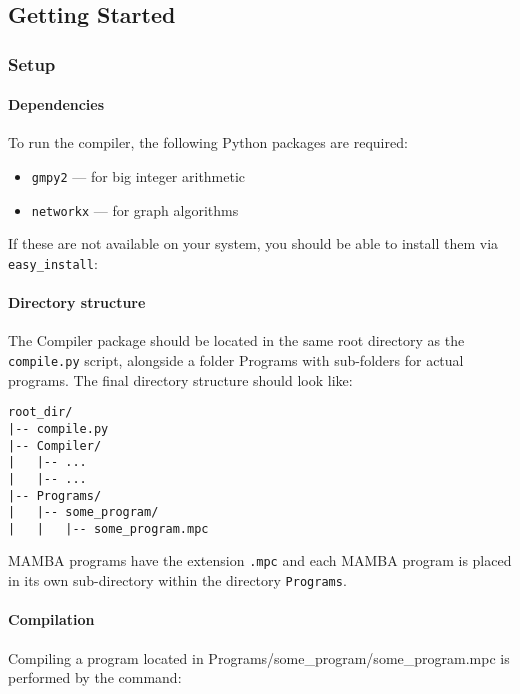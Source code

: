 
\subsection{Getting Started}

\subsubsection{Setup}

\paragraph{Dependencies}

To run the compiler, the following Python packages are required:
\begin{itemize}
\item \texttt{gmpy2} --- for big integer arithmetic
\item \texttt{networkx} --- for graph algorithms
\end{itemize}
If these are not available on your system, you should be able to install them
via \texttt{easy\_install}:


\paragraph{Directory structure}

The Compiler package should be located in the same root directory as the
\texttt{compile.py} script, alongside a folder Programs with sub-folders for
actual programs. The final directory structure should look like:

\begin{lstlisting}[language={}]
root_dir/
|-- compile.py
|-- Compiler/
|   |-- ...
|   |-- ...
|-- Programs/
|   |-- some_program/
|   |   |-- some_program.mpc
\end{lstlisting}
MAMBA programs have the extension \verb+.mpc+ and each MAMBA
program is placed in its own sub-directory within
the directory \verb+Programs+.

\paragraph{Compilation}

Compiling a program located in Programs/some\_program/some\_program.mpc is performed by the
command:

